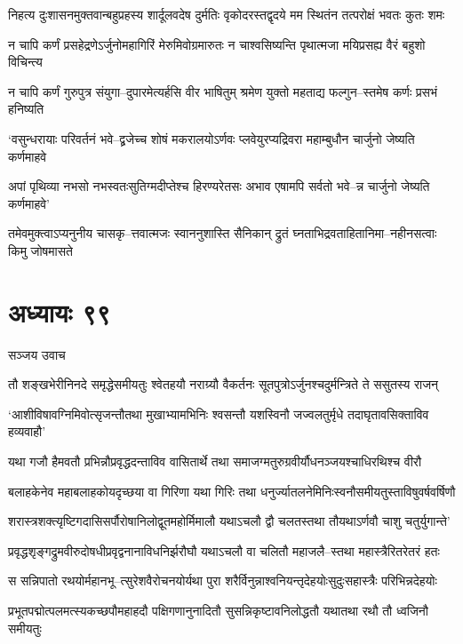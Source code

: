 \twolineshloka
{निहत्य दुःशासनमुक्तवान्बहुप्रहस्य शार्दूलवदेष दुर्मतिः}
{वृकोदरस्तद्वृदये मम स्थितंन तत्परोक्षं भवतः कुतः शमः}


\twolineshloka
{न चापि कर्णं प्रसहेद्रणेऽर्जुनोमहागिरिं मेरुमिवोग्रमारुतः}
{न चाश्वसिष्यन्ति पृथात्मजा मयिप्रसह्य वैरं बहुशो विचिन्त्य}


\twolineshloka
{न चापि कर्णं गुरुपुत्र संयुगा--दुपारमेत्यर्हसि वीर भाषितुम्}
{श्रमेण युक्तो महताद्य फल्गुन--स्तमेष कर्णः प्रसभं हनिष्यति}


\twolineshloka
{`वसुन्धरायाः परिवर्तनं भवे--द्व्रजेच्च शोषं मकरालयोऽर्णवः}
{प्लवेयुरप्यद्रिवरा महाम्बुधौन चार्जुनो जेष्यति कर्णमाहवे}


\twolineshloka
{अपां पृथिव्या नभसो नभस्वतःसुतिग्मदीप्तेश्च हिरण्यरेतसः}
{अभाव एषामपि सर्वतो भवे--न्न चार्जुनो जेष्यति कर्णमाहवे'}


\twolineshloka
{तमेवमुक्त्वाऽप्यनुनीय चासकृ--त्तवात्मजः स्वाननुशास्ति सैनिकान्}
{द्रुतं घ्नताभिद्रवताहितानिमा--नहीनसत्वाः किमु जोषमासते}


\chapter{अध्यायः ९९}
\twolineshloka
{सञ्जय उवाच}
{}


\twolineshloka
{तौ शङ्खभेरीनिनदे समृद्धेसमीयतुः श्वेतहयौ नराग्र्यौ}
{वैकर्तनः सूतपुत्रोऽर्जुनश्चदुर्मन्त्रिते ते ससुतस्य राजन्}


\twolineshloka
{`आशीविषावग्निमिवोत्सृजन्तौतथा मुखाभ्यामभिनिः श्वसन्तौ}
{यशस्विनौ जज्वलतुर्मृधे तदाघृतावसिक्ताविव हव्यवाहौ'}


\twolineshloka
{यथा गजौ हैमवतौ प्रभिन्नौप्रवृद्धदन्ताविव वासितार्थे}
{तथा समाजग्मतुरुग्रवीर्यौधनञ्जयश्चाधिरथिश्च वीरौ}


\twolineshloka
{बलाहकेनेव महाबलाहकोयदृच्छया वा गिरिणा यथा गिरिः}
{तथा धनुर्ज्यातलनेमिनिःस्वनौसमीयतुस्ताविषुवर्षवर्षिणौ}


\twolineshloka
{शरास्त्रशक्त्यृष्टिगदासिसर्पौरोषानिलोद्वूतमहोर्मिमालौ}
{यथाऽचलौ द्वौ चलतस्तथा तौयथाऽर्णवौ चाशु चतुर्युगान्ते'}


\twolineshloka
{प्रवृद्धशृङ्गद्रुमवीरुदोषधीप्रवृद्वनानाविधनिर्झरौघौ}
{यथाऽचलौ वा चलितौ महाजलै--स्तथा महास्त्रैरितरेतरं हतः}


\twolineshloka
{स सन्निपातो रथयोर्महानभू--त्सुरेशवैरोचनयोर्यथा पुरा}
{शरैर्विनुन्नाश्वनियन्तृदेहयोःसुदुःसहास्त्रैः परिभिन्नदेहयोः}


\twolineshloka
{प्रभूतपद्मोत्पलमत्स्यकच्छपौमहाहदौ पक्षिगणानुनादितौ}
{सुसन्निकृष्टावनिलोद्धतौ यथातथा रथौ तौ ध्वजिनौ समीयतुः}


